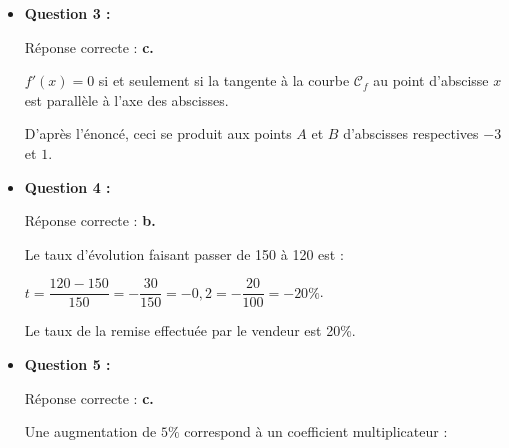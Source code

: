 \begin{corrige}
\begin{itemize}
          \par
          \item \textbf{Question 3 :}
          \par
          Réponse correcte :\quad\textbf{ c.}
          \par
          $f'(x)=0$ si et seulement si la tangente à la courbe $\mathscr{C}_f$ au point d'abscisse $x$ est parallèle à l'axe des abscisses.
          \par
          D'après l'énoncé, ceci se produit aux points $A$ et $B$ d'abscisses respectives $-3$ et $1$.
          \par
          \par
          \item \textbf{Question 4 :}
          \par
          Réponse correcte :\quad\textbf{ b.}
          \par
          Le taux d'évolution faisant passer de 150 à 120 est :
          \par
          $t=\dfrac{120-150}{150}=-\dfrac{30}{150}=-0,2=-\dfrac{20}{100}=-20\%$.
          \par
          Le taux de la remise effectuée par le vendeur est 20\%.
          \par
          \par
          \item \textbf{Question 5 :}
          \par
          Réponse correcte :\quad\textbf{ c.}
          \par
          Une augmentation de $5\%$ correspond à un coefficient multiplicateur :

\end{itemize}
\end{corrige}
